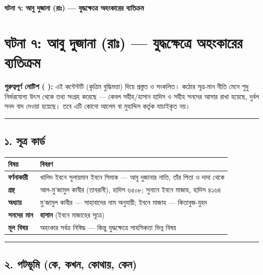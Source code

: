 

\begin{center}{\Large\bfseries\color{emerald} ঘটনা ৭: আবু দুজানা (রাঃ) — যুদ্ধক্ষেত্রে অহংকারের ব্যতিক্রম}\end{center}
\vspace{1em}
\section*{ঘটনা ৭: আবু দুজানা (রাঃ) — যুদ্ধক্ষেত্রে অহংকারের ব্যতিক্রম}

\begin{warnbox}
 \textbf{গুরুত্বপূর্ণ নোটিশ ( ):} এই কন্টেন্টটি  (কৃত্রিম বুদ্ধিমত্তা) দিয়ে প্রস্তুত ও সংকলিত।  কঠোর সূত্র-মান নীতি মেনে শুধু নির্ভরযোগ্য উৎস থেকে তথ্য সংগ্রহ করেছে — কেবল সহীহ/হাসান হাদিস ও সহীহ সনদের আসার রাখা হয়েছে, দুর্বল সনদ বাদ দেওয়া হয়েছে। তবে এটি কোনো আলেম বা মুহাদ্দিস কর্তৃক যাচাইকৃত নয়।
\end{warnbox}


\medskip\hrule\medskip

\subsection*{১. সূত্র কার্ড}

\begin{table}[h]\centering\small
\begin{tabular}{ll}
বিষয় & বিবরণ \\
\hline
\textbf{বর্ণনাকারী} & খালিদ ইবনে সুলায়মান ইবনে সিমাক — আবু দুজানার নাতি, তাঁর পিতা ও দাদা থেকে \\
\textbf{গ্রন্থ} & আল-মু'জামুল কাবীর (তাবরানী), হাদিস ৬৫০৮; সুনানে ইবনে মাজাহ, হাদিস ৪১৬৪ \\
\textbf{অধ্যায়} & মু'জামুল কাবীর — সাহাবাদের নাম অনুযায়ী; ইবনে মাজাহ — কিতাবুজ-যুহদ \\
\textbf{সনদের মান} & \textbf{হাসান} (ইবনে মাজাহের সূত্রে) \\
\textbf{মূল বিষয়} & অহংকার সর্বত্র নিষিদ্ধ — কিন্তু যুদ্ধক্ষেত্রে সাহসিকতা ভিন্ন বিষয় \\
\hline
\end{tabular}
\end{table}

\medskip\hrule\medskip

\subsection*{২. পটভূমি (কে, কখন, কোথায়, কেন)}

